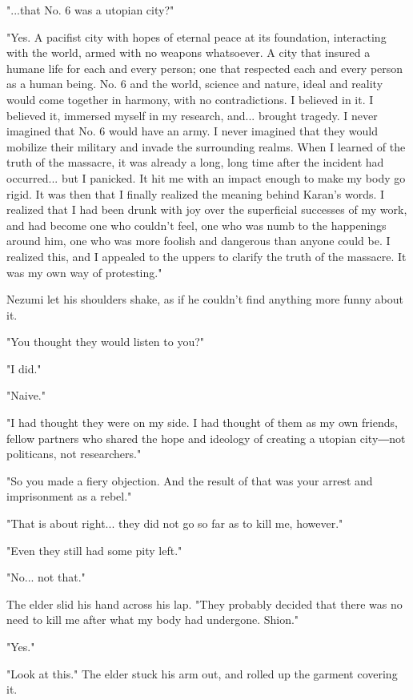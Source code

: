 "...that No. 6 was a utopian city?"

"Yes. A pacifist city with hopes of eternal peace at its foundation,
interacting with the world, armed with no weapons whatsoever. A city
that insured a humane life for each and every person; one that respected
each and every person as a human being. No. 6 and the world, science and
nature, ideal and reality would come together in harmony, with no
contradictions. I believed in it. I believed it, immersed myself in my
research, and... brought tragedy. I never imagined that No. 6 would have
an army. I never imagined that they would mobilize their military and
invade the surrounding realms. When I learned of the truth of the
massacre, it was already a long, long time after the incident had
occurred... but I panicked. It hit me with an impact enough to make my
body go rigid. It was then that I finally realized the meaning behind
Karan's words. I realized that I had been drunk with joy over the
superficial successes of my work, and had become one who couldn't feel,
one who was numb to the happenings around him, one who was more foolish
and dangerous than anyone could be. I realized this, and I appealed to
the uppers to clarify the truth of the massacre. It was my own way of
protesting."

Nezumi let his shoulders shake, as if he couldn't find anything more
funny about it.

"You thought they would listen to you?"

"I did."

"Naive."

"I had thought they were on my side. I had thought of them as my own
friends, fellow partners who shared the hope and ideology of creating a
utopian city―not politicans, not researchers."

"So you made a fiery objection. And the result of that was your arrest
and imprisonment as a rebel."

"That is about right... they did not go so far as to kill me, however."

"Even they still had some pity left."

"No... not that."

The elder slid his hand across his lap. "They probably decided that
there was no need to kill me after what my body had undergone. Shion."

"Yes."

"Look at this." The elder stuck his arm out, and rolled up the garment
covering it.

